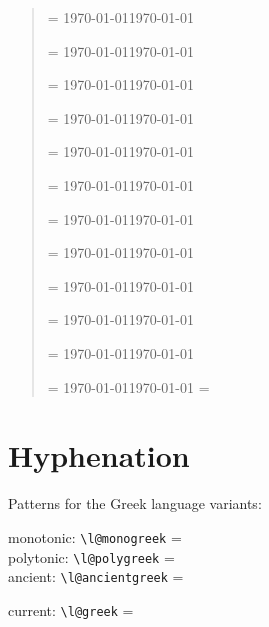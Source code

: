\documentclass[a4paper]{article}
\begin{document}
\begin{quotation}
  \setcounter{origmonth}{\the\month}
   \month=\value{foo} \today \qquad \MakeUppercase{\today}

   \month=\value{foo} \today \qquad \MakeUppercase{\today}

   \month=\value{foo} \today \qquad \MakeUppercase{\today}

   \month=\value{foo} \today \qquad \MakeUppercase{\today}

   \month=\value{foo} \today \qquad \MakeUppercase{\today}

   \month=\value{foo} \today \qquad \MakeUppercase{\today}

   \month=\value{foo} \today \qquad \MakeUppercase{\today}

   \month=\value{foo} \today \qquad \MakeUppercase{\today}

   \month=\value{foo} \today \qquad \MakeUppercase{\today}

   \month=\value{foo} \today \qquad \MakeUppercase{\today}

   \month=\value{foo} \today \qquad \MakeUppercase{\today}

   \month=\value{foo} \today \qquad \MakeUppercase{\today}
  \month=\value{origmonth}
\end{quotation}


\section{Hyphenation}

Patterns for the Greek language variants:

\makeatletter
monotonic: \verb|\l@monogreek| = \the\l@monogreek \\
polytonic: \verb|\l@polygreek| = \the\l@polygreek \\
ancient:   \verb|\l@ancientgreek| = \the\l@ancientgreek

current: \verb|\l@greek| = \the\l@greek
\makeatletter

\newcommand*{\sample}{%
  \ensureascii{monotonic:} Ευρετήριο,  επίσης,  Απόδειξη,  Θράκη,  τραγωδία\\
  \ifdefined \UnicodeEncodingName \else
     \ensureascii{'' '' translit:} Euret'hrio, ep'ishs, Ap'odeixh, Jr'akh,
                                   tragwd'ia\\
  \fi
  \ensureascii{polytonic:} Εὑρετήριο,  ἐπίσης,  Ἀπόδειξη, Θρᾴκη, τραγῳδία\\
  \ifdefined \UnicodeEncodingName \else
     \ensureascii{'' translit:} E<uret'hrio, >ep'ishs, >Ap'odeixh, Jr'a|kh,
                                tragw|d'ia\\
  \fi
  \ensureascii{ancient:}   Εὑρετήριον, ὡσαύτως, Ἀπόδειξις, Θρᾴκη, τραγῳδία%
}
\end{document}
